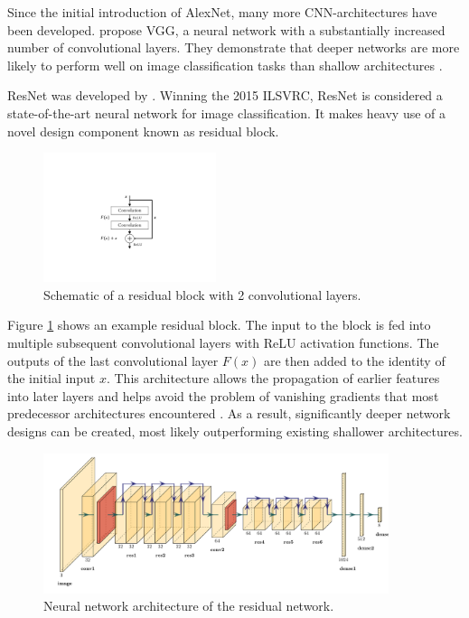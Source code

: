 \documentclass{l4proj}
\begin{document}
Since the initial introduction of AlexNet, many more CNN-architectures have been developed. \citet{simonyan_very_2015} propose VGG, a neural network with a substantially increased number of convolutional layers. They demonstrate that deeper networks are more likely to perform well on image classification tasks than shallow architectures \citep{alom_history_2018}.

ResNet was developed by \citet{he_deep_2016}. Winning the 2015 ILSVRC, ResNet is considered a state-of-the-art neural network for image classification. It makes heavy use of a novel design component known as residual block. 

\begin{figure}[ht]
  \centering
  \includegraphics[width=0.45\textwidth, trim={7cm 4.8cm 7cm 6cm}, clip]{images/models/res_block}
  \caption{Schematic of a residual block with 2 convolutional layers.}
  \label{fig:res_block}
\end{figure}

Figure \ref{fig:res_block} shows an example residual block. The input to the block is fed into multiple subsequent convolutional layers with ReLU activation functions. The outputs of the last convolutional layer $F(x)$ are then added to the identity of the initial input $x$. This architecture allows the propagation of earlier features into later layers and helps avoid the problem of vanishing gradients that most predecessor architectures encountered \citep{alom_history_2018}. As a result, significantly deeper network designs can be created, most likely outperforming existing shallower architectures.

\begin{figure}[ht]
  \centering
  \includegraphics[width=0.9\textwidth]{images/models/resnet}
  \caption{Neural network architecture of the residual network.}
  \label{fig:resnet}
\end{figure}
\end{document}

